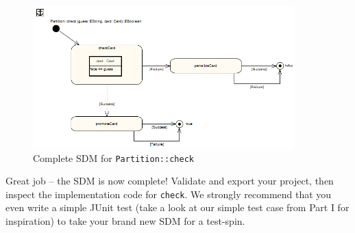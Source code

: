 \begin{stepbystep}
\begin{figure}[htbp]
\begin{center}
  \includegraphics[width=0.9\textwidth]{../../org.moflon.doc.handbook.03_storyDiagrams/04_checkCard/visCheImages/ea_sdmCheckComplete}
  \caption{Complete SDM for \texttt{Partition::check}}
  \label{ea:sdm_check_finish}
\end{center}
\end{figure}

\item Great job -- the SDM is now complete! Validate and export your project, then inspect the implementation code for \texttt{check}. We
strongly recommend that you even write a simple JUnit test (take a look at our simple test case from Part I for inspiration) to take your brand new SDM for a
test-spin.

\end{stepbystep}
